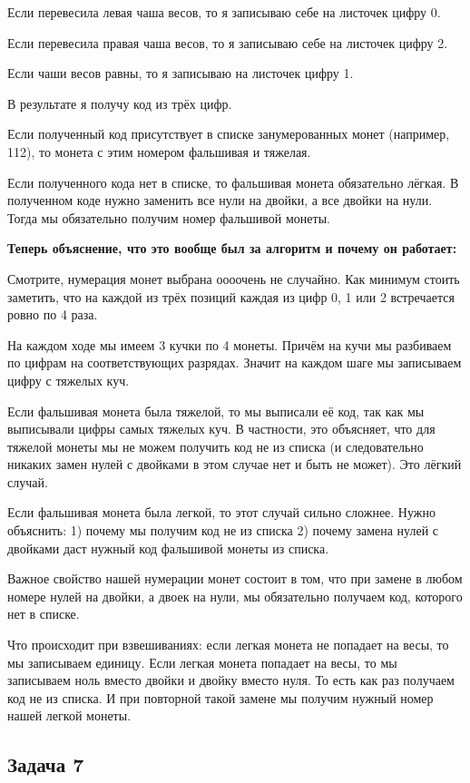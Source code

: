Если перевесила левая чаша весов, то я записываю себе на листочек цифру 0.

Если перевесила правая чаша весов, то я записываю себе на листочек цифру 2.

Если чаши весов равны, то я записываю на листочек цифру 1.

В результате я получу код из трёх цифр.

Если полученный код присутствует в списке занумерованных монет (например, 112), то монета с этим номером фальшивая и тяжелая.

Если полученного кода нет в списке, то фальшивая монета обязательно лёгкая. В полученном коде нужно заменить все нули на двойки, а все двойки на нули. Тогда мы обязательно получим номер фальшивой монеты.

\textbf{Теперь объяснение, что это вообще был за алгоритм и почему он работает:}

Смотрите, нумерация монет выбрана оооочень не случайно. Как минимум стоить заметить, что на каждой из трёх позиций каждая из цифр 0, 1 или 2 встречается ровно по 4 раза.

На каждом ходе мы имеем 3 кучки по 4 монеты. Причём на кучи мы разбиваем по цифрам на соответствующих разрядах. Значит на каждом шаге мы записываем цифру с тяжелых куч. 

Если фальшивая монета была тяжелой, то мы выписали её код, так как мы выписывали цифры самых тяжелых куч. В частности, это объясняет, что для тяжелой монеты мы не можем получить код не из списка (и следовательно никаких замен нулей с двойками в этом случае нет и быть не может). Это лёгкий случай.

Если фальшивая монета была легкой, то этот случай сильно сложнее. Нужно объяснить: 1) почему мы получим код не из списка 2) почему замена нулей с двойками даст нужный код фальшивой монеты из списка.

Важное свойство нашей нумерации монет состоит в том, что при замене в любом номере нулей на двойки, а двоек на нули, мы обязательно получаем код, которого нет в списке.

Что происходит при взвешиваниях: если легкая монета не попадает на весы, то мы записываем единицу. Если легкая монета попадает на весы, то мы записываем ноль вместо двойки и двойку вместо нуля. То есть как раз получаем код не из списка. И при повторной такой замене мы получим нужный номер нашей легкой монеты.
\subsection{Задача 7}

